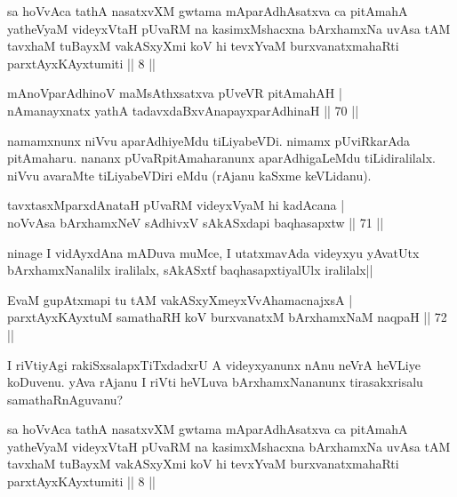 

\begin{shl}
sa hoVvAca tathA nasatxvXM gwtama mAparAdhAsatxva ca pitAmahA yatheVyaM videyxVtaH pUvaRM na kasimxMshacxna bArxhamxNa uvAsa tAM tavxhaM tuBayxM vakASxyXmi koV hi tevxYvaM burxvanatxmahaRti parxtAyxKAyxtumiti || 8 ||
\end{shl}

\begin{shl}
mAnoV\s parAdhinoV maMsAthxsatxva pUveVR pitAmahAH | \\
nAmanayxnatx yathA tadavxdaBxvAnapayxparAdhinaH \hfill|| 70 || 
\end{shl}

\begin{artha}
namamxnunx niVvu aparAdhiyeMdu tiLiyabeVDi. nimamx pUviRkarAda 
pitAmaharu. nananx pUvaRpitAmaharanunx aparAdhigaLeMdu tiLidiralilalx. 
niVvu avaraMte tiLiyabeVDiri eMdu (rAjanu kaSxme keVLidanu).
\end{artha}

\begin{shl}
tavxtasxMparxdAnataH pUvaRM videyxVyaM hi kadAcana | \\
noVvAsa bArxhamxNeV sAdhivxV sAkASxdapi baqhasapxtw \hfill|| 71 || 
\end{shl}

\begin{artha}
ninage I vidAyxdAna mADuva muMce, I utatxmavAda videyxyu yAvatUtx 
bArxhamxNanalilx iralilalx, sAkASxtf baqhasapxtiyalUlx iralilalx||
\end{artha}

\begin{shl}
EvaM gupAtxmapi tu tAM vakASxyXmeyxVvAhamacnajxsA | \\
parxtAyxKAyxtuM samathaRH koV burxvanatxM bArxhamxNaM naqpaH \hfill|| 72 || 
\end{shl}

\begin{artha}
I riVtiyAgi rakiSxsalapxTiTxdadxrU A videyxyanunx nAnu neVrA heVLiye 
koDuvenu. yAva rAjanu I riVti heVLuva bArxhamxNananunx tirasakxrisalu 
samathaRnAguvanu?
\end{artha}


\begin{shl}
sa hoVvAca tathA nasatxvXM gwtama mAparAdhAsatxva ca pitAmahA yatheVyaM videyxVtaH pUvaRM na kasimxMshacxna bArxhamxNa uvAsa tAM tavxhaM tuBayxM vakASxyXmi koV hi tevxYvaM burxvanatxmahaRti parxtAyxKAyxtumiti || 8 ||
\end{shl}

